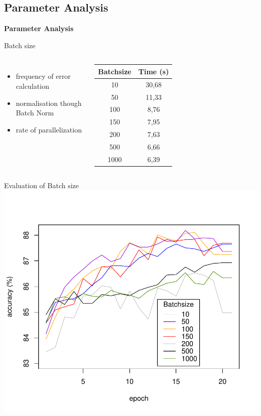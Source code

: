\documentclass[aspectratio=1610, 12pt]{beamer}
\begin{document}
\subsection{Parameter Analysis}
\begin{frame}
\centering
\vfill
\textbf{\Large Parameter Analysis}
\vfill
\end{frame}
\begin{frame}{Batch size}
\begin{columns}
	\begin{itemize}
		\item frequency of error calculation
		\item normalisation though Batch Norm 
		\item rate of parallelization
	\end{itemize}
	\centering
	\begin{tabular}{|c|c|}\hline
		Batchsize&Time (s)\\\hline
		10&30,68\\\hline
		50&11,33\\\hline
		100&8,76\\\hline
		150&7,95\\\hline
		200&7,63\\\hline
		500&6,66\\\hline
		1000&6,39\\\hline
		
	\end{tabular}
\end{columns}
\end{frame}



\begin{frame}{Evaluation of Batch size}
\centering
\vspace*{-1cm}\includegraphics[scale=0.62]{images/batchsize_measurement.pdf}
\end{frame}
\end{document}

